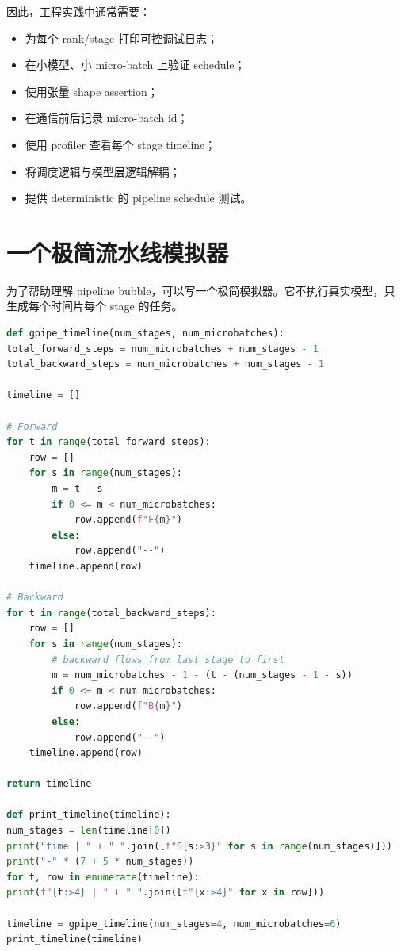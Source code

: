 因此，工程实践中通常需要：

\begin{itemize}
\item 为每个 rank/stage 打印可控调试日志；
\item 在小模型、小 micro-batch 上验证 schedule；
\item 使用张量 shape assertion；
\item 在通信前后记录 micro-batch id；
\item 使用 profiler 查看每个 stage timeline；
\item 将调度逻辑与模型层逻辑解耦；
\item 提供 deterministic 的 pipeline schedule 测试。
\end{itemize}

\section{一个极简流水线模拟器}
\label{sec:minimal-pipeline-simulator}

为了帮助理解 pipeline bubble，可以写一个极简模拟器。它不执行真实模型，只生成每个时间片每个 stage 的任务。

\begin{lstlisting}[language=Python,caption={极简 GPipe 时间线模拟器},label={lst:minimal-gpipe-simulator}]
def gpipe_timeline(num_stages, num_microbatches):
total_forward_steps = num_microbatches + num_stages - 1
total_backward_steps = num_microbatches + num_stages - 1

timeline = []

# Forward
for t in range(total_forward_steps):
    row = []
    for s in range(num_stages):
        m = t - s
        if 0 <= m < num_microbatches:
            row.append(f"F{m}")
        else:
            row.append("--")
    timeline.append(row)

# Backward
for t in range(total_backward_steps):
    row = []
    for s in range(num_stages):
        # backward flows from last stage to first
        m = num_microbatches - 1 - (t - (num_stages - 1 - s))
        if 0 <= m < num_microbatches:
            row.append(f"B{m}")
        else:
            row.append("--")
    timeline.append(row)

return timeline

def print_timeline(timeline):
num_stages = len(timeline[0])
print("time | " + " ".join([f"S{s:>3}" for s in range(num_stages)]))
print("-" * (7 + 5 * num_stages))
for t, row in enumerate(timeline):
print(f"{t:>4} | " + " ".join([f"{x:>4}" for x in row]))

timeline = gpipe_timeline(num_stages=4, num_microbatches=6)
print_timeline(timeline)
\end{lstlisting}

